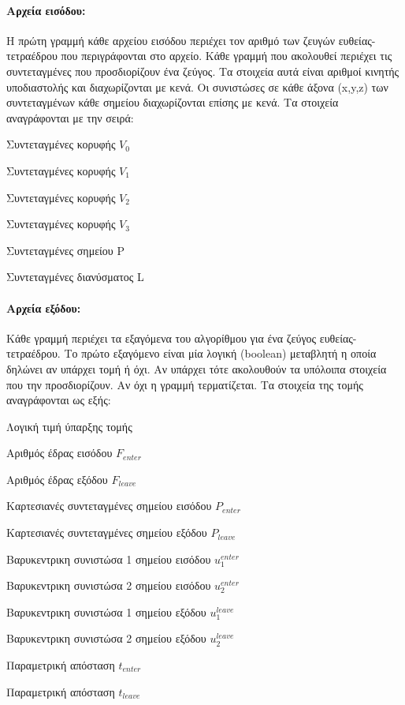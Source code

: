 \paragraph{Αρχεία εισόδου:} Η πρώτη γραμμή κάθε αρχείου εισόδου περιέχει τον αριθμό των ζευγών ευθείας-τετραέδρου που περιγράφονται στο αρχείο. Κάθε γραμμή που ακολουθεί περιέχει τις συντεταγμένες που προσδιορίζουν ένα ζεύγος. Τα στοιχεία αυτά είναι αριθμοί κινητής υποδιαστολής και διαχωρίζονται με κενά. Οι συνιστώσες σε κάθε άξονα (x,y,z) των συντεταγμένων κάθε σημείου διαχωρίζονται επίσης με κενά. Τα στοιχεία αναγράφονται με την σειρά:
\begin{enumerate*}
\item Συντεταγμένες κορυφής $V_0$ 
\item Συντεταγμένες κορυφής $V_1$
\item Συντεταγμένες κορυφής $V_2$
\item Συντεταγμένες κορυφής $V_3$ 
\item Συντεταγμένες σημείου P
\item Συντεταγμένες διανύσματος L
\end{enumerate*}

\paragraph{Αρχεία εξόδου:} Κάθε γραμμή περιέχει τα εξαγόμενα του αλγορίθμου για ένα ζεύγος ευθείας-τετραέδρου. Το πρώτο εξαγόμενο είναι μία λογική (boolean) μεταβλητή η οποία δηλώνει αν υπάρχει τομή ή όχι. Αν υπάρχει τότε ακολουθούν τα υπόλοιπα στοιχεία που την προσδιορίζουν. Αν όχι η γραμμή τερματίζεται. Τα στοιχεία της τομής αναγράφονται ως εξής: 

\begin{enumerate*}
\item Λογική τιμή ύπαρξης τομής
\item Αριθμός έδρας εισόδου $F_{enter}$
\item Αριθμός έδρας εξόδου $F_{leave}$
\item Καρτεσιανές συντεταγμένες σημείου εισόδου $P_{enter}$
\item Καρτεσιανές συντεταγμένες σημείου εξόδου $P_{leave}$
\item Βαρυκεντρικη συνιστώσα 1 σημείου εισόδου $u^{enter}_1$
\item Βαρυκεντρικη συνιστώσα 2 σημείου εισόδου $u^{enter}_2$
\item Βαρυκεντρικη συνιστώσα 1 σημείου εξόδου $u^{leave}_1$
\item Βαρυκεντρικη συνιστώσα 2 σημείου εξόδου $u^{leave}_2$
\item Παραμετρική απόσταση $t_{enter}$
\item Παραμετρική απόσταση $t_{leave}$
\end{enumerate*}

